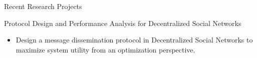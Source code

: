\documentclass{resume} %
\begin{document}
\begin{rSection}{Recent Research Projects}
\begin{rSubsection}{Protocol Design and Performance Analysis for Decentralized Social Networks}{}{}{}
\item[]
\end{rSubsection}
\vspace{-2.5em}
\begin{itemize}
\setlength{\leftmargin}{0em}
    \setlength{\itemsep}{0.2em}
    \setlength{\parskip}{0pt}
\item Design a message dissemination protocol in Decentralized Social Networks to maximize system utility from an optimization perspective.
\end{itemize}
\end{rSection}
\end{document}
